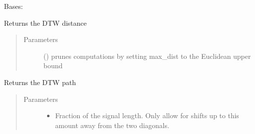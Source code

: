 \documentclass[letterpaper,10pt,english]{sphinxmanual}
\begin{document}
\begin{fulllineitems}
\label{\detokenize{modules/dtw_analysis:dtwhaclustering.dtw_analysis.dtw_signal_pairs}}
\sphinxAtStartPar
Bases: 

\begin{fulllineitems}
\label{\detokenize{modules/dtw_analysis:dtwhaclustering.dtw_analysis.dtw_signal_pairs.compute_distance}}
\sphinxAtStartPar
Returns the DTW distance
\begin{quote}\begin{description}
\item[{Parameters}] \leavevmode
\sphinxAtStartPar
{} () \textendash{} prunes computations by setting max\_dist to the Euclidean upper bound

\end{description}\end{quote}

\end{fulllineitems}


\begin{fulllineitems}
\label{\detokenize{modules/dtw_analysis:dtwhaclustering.dtw_analysis.dtw_signal_pairs.compute_warping_path}}
\sphinxAtStartPar
Returns the DTW path
\begin{quote}\begin{description}
\item[{Parameters}] \leavevmode\begin{itemize}
\item {} 
\sphinxAtStartPar
{} \textendash{} Fraction of the signal length. Only allow for shifts up to this amount away from the two diagonals.


\end{itemize}
\end{description}
\end{quote}
\end{fulllineitems}
\end{fulllineitems}
\end{document}

